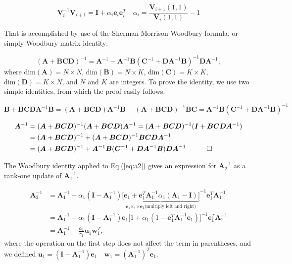\begin{equation}
\bm V_i^{-1} \bm V_{i+1} = \bm I + \alpha_i \bm e_i \bm e_i^T \quad \alpha_i = \frac{\bm V_{i+1}(1,1)}{\bm V_i (1,1)} -1
\end{equation}

That is accomplished by use of the  Sherman-Morrison-Woodbury formula, or simply Woodbury matrix identity:

\begin{equation}
( \bm A + \bm B \bm C \bm D )^{-1} = \bm A^{-1} - \bm A^{-1} \bm B ( \bm C^{-1} + \bm D \bm A^{-1} \bm B )^{-1} \bm D \bm A^{-1} ,
\end{equation}
where $\text{dim}(\bm A) = N \times N $, $\text{dim}(\bm B) = N \times K $, $\text{dim}(\bm C) = K \times K $, $\text{dim}(\bm D) = K \times N $, and $N$ and $K$ are integers.
To prove the identity, we use two simple identities, from which the proof easily follows.

\begin{equation}
\bm B + \bm B \bm C \bm D \bm A^{-1} \bm B = ( \bm A + \bm B \bm C \bm D ) \bm A^{-1} \bm B
\quad\,\,
( \bm A + \bm B \bm C \bm D )^{-1} \bm B \bm C = \bm A^{-1} \bm B ( \bm C^{-1} + \bm D \bm A^{-1} \bm B )^{-1}
\end{equation}

\begin{equation}
\begin{split}
\bm A^{-1} &= ( \bm A + \bm B \bm C \bm D )^{-1} ( \bm A + \bm B \bm C \bm D ) \bm A^{-1} = ( \bm A + \bm B \bm C \bm D )^{-1} ( \bm I + \bm B \bm C \bm D \bm A^{-1} ) \\
&= ( \bm A + \bm B \bm C \bm D )^{-1} + ( \bm A + \bm B \bm C \bm D )^{-1} \bm B \bm C \bm D \bm A^{-1} \\
&= ( \bm A + \bm B \bm C \bm D )^{-1} + \bm A^{-1} \bm B ( \bm C^{-1} + \bm D \bm A^{-1} \bm B ) \bm D \bm A^{-1}
\quad
\qed
\end{split}
\end{equation}

The Woodbury identity applied to Eq.(\ref{eq:a2}) gives an expression for $\bm A_2^{-1}$ as a rank-one update of $\bm A_1^{-1}$.

\begin{equation}\label{eq:greenUpdate}
\begin{split}
\bm A_2^{-1} &= \bm A_1^{-1} - \alpha_1 ( \bm I - \bm A_1^{-1} ) {\underbrace{\bigg[ \bm e_1 + \bm e_1^T \bm A_1^{-1} \alpha_1 (  \bm A_1 - \bm I ) \bigg]}_{\bm e_1 \times, \times \bm e_1 \text{(multiply left and right)}}}^{-1} \bm e_1^T \bm A_1^{-1} \\
&= \bm A_1^{-1} - \alpha_1 ( \bm I - \bm A_1^{-1} ) \bm e_1 \bigg[ 1 + \alpha_1 ( 1 - \bm e_1^T \bm A_1^{-1} \bm e_1 ) \bigg]^{-1} \bm e_1^T \bm A_1^{-1}  \\
&= \bm A_1^{-1} - \frac{\alpha_1}{r_1} \bm u_1 \bm w_1^T ,
\end{split}
\end{equation}
where the operation on the first step does not affect the term in parentheses, and we defined
$
\bm u_1 = (\bm I - \bm A_1^{-1} ) \bm e_1 \quad \bm w_1 = (\bm A_1^{-1})^T \bm e_1
$.

